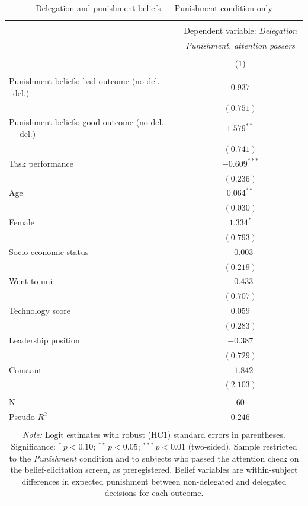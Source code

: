 \begin{table}[!htbp]
\centering
\scriptsize
\caption{Delegation and punishment beliefs --- Punishment condition only}
\label{tab:reg_delegation_beliefs}
\begin{tabular}{@{\extracolsep{5pt}}l|c}
\\[-1.8ex]\hline
\hline \\[-1.8ex]
& \multicolumn{1}{c}{Dependent variable: \textit{Delegation}}\\[0.1cm]
& \textit{Punishment, attention passers} \\
\\[-1.8ex] & (1) \\
\hline \\[-1.8ex]
 Punishment beliefs: bad outcome (no del.~$-$~del.) & $0.937$ \\
  & $(0.751)$ \\[0.1cm]
 Punishment beliefs: good outcome (no del.~$-$~del.) & $1.579^{**}$ \\
  & $(0.741)$ \\[0.1cm]
 Task performance & $-0.609^{***}$ \\
  & $(0.236)$ \\[0.1cm]
 Age & $0.064^{**}$ \\
  & $(0.030)$ \\[0.1cm]
 Female & $1.334^{*}$ \\
  & $(0.793)$ \\[0.1cm]
 Socio-economic status & $-0.003$ \\
  & $(0.219)$ \\[0.1cm]
 Went to uni & $-0.433$ \\
  & $(0.707)$ \\[0.1cm]
 Technology score & $0.059$ \\
  & $(0.283)$ \\[0.1cm]
 Leadership position & $-0.387$ \\
  & $(0.729)$ \\[0.1cm]
 Constant & $-1.842$ \\
  & $(2.103)$ \\[0.1cm]
\hline \\[-1.8ex]
 N & $60$ \\
 Pseudo $R^2$ & $0.246$ \\
\hline
\hline \\[-1.8ex]
\multicolumn{2}{c}{\begin{minipage}{0.85\textwidth}\footnotesize \textit{Note:} Logit estimates with robust (HC1) standard errors in parentheses. Significance: $^{*}\,p<0.10$; $^{**}\,p<0.05$; $^{***}\,p<0.01$ (two-sided). Sample restricted to the \textit{Punishment} condition and to subjects who passed the attention check on the belief-elicitation screen, as preregistered. Belief variables are within-subject differences in expected punishment between non-delegated and delegated decisions for each outcome.\end{minipage}}
\end{tabular}
\end{table}
